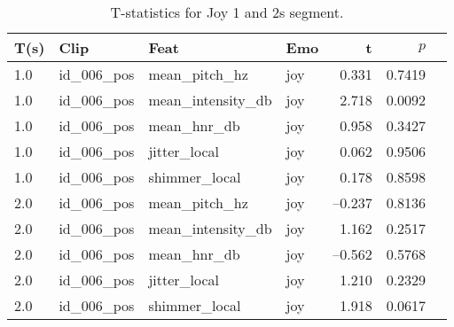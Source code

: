   
  \begin{table}[h]
    \centering
    \caption{T-statistics for Joy 1 and 2s segment.}
    \label{tab:ttest_joy_1s}
    \begin{tabular}{l l l l r r l}
      \toprule
      T(s) & Clip           & Feat            & Emo & t & $p$  \\
      \midrule
      1.0  & id\_006\_pos   & mean\_pitch\_hz       & joy     & 0.331        & 0.7419       \\
      1.0  & id\_006\_pos   & mean\_intensity\_db   & joy     & 2.718        & 0.0092            \\
      1.0  & id\_006\_pos   & mean\_hnr\_db         & joy     & 0.958        & 0.3427          \\
      1.0  & id\_006\_pos   & jitter\_local         & joy     & 0.062        & 0.9506          \\
      1.0  & id\_006\_pos   & shimmer\_local        & joy     & 0.178        & 0.8598           \\
      2.0  & id\_006\_pos   & mean\_pitch\_hz     & joy     & –0.237  & 0.8136  \\
2.0  & id\_006\_pos   & mean\_intensity\_db & joy     &  1.162  & 0.2517  \\
2.0  & id\_006\_pos   & mean\_hnr\_db       & joy     & –0.562  & 0.5768  \\
2.0  & id\_006\_pos   & jitter\_local       & joy     &  1.210  & 0.2329  \\
2.0  & id\_006\_pos   & shimmer\_local      & joy     &  1.918  & 0.0617  \\
      \bottomrule
    \end{tabular}
\end{table}
